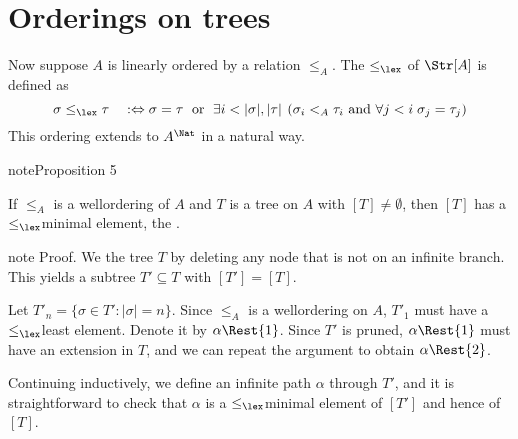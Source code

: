 \documentclass[letterpaper,10pt,english]{jupyterBook}
\begin{document}
\section{Orderings on trees}
\label{\detokenize{trees:orderings-on-trees}}
\sphinxAtStartPar
Now suppose \(A\) is linearly ordered by a relation \(\leq_A\).
The  \(\leq_{\lex}\) of \(\Str[A]\) is defined as
\begin{equation*}
	\sigma \leq_{\lex} \tau \quad :\Leftrightarrow \quad \\
        \sigma = \tau \; \text{ or } \; \exists i <|\sigma|,|\tau| \: \left( \sigma_i <_A \tau_i \text{ and } \forall j < i \; \sigma_j = \tau_j  \right )  
\end{equation*}
\sphinxAtStartPar
This ordering extends to \(A^\Nat\) in a natural way.
\label{trees:prop-leftmost-branch}
\begin{sphinxadmonition}{note}{Proposition 5}



\sphinxAtStartPar
If \(\leq_A\) is a well\sphinxhyphen{}ordering of \(A\) and \(T\) is a tree on \(A\) with \([T] \neq \emptyset\), then \([T]\) has a \(\leq_{\lex}\)\sphinxhyphen{}minimal element, the .
\end{sphinxadmonition}

\begin{sphinxadmonition}{note}
\sphinxAtStartPar
Proof. We  the tree \(T\) by deleting any node that is not on an infinite branch. This yields a subtree \(T' \subseteq T\) with \([T'] = [T]\).

\sphinxAtStartPar
Let \(T'_n = \{\sigma \in T' \colon |\sigma| = n \}\). Since \(\leq_A\) is a well\sphinxhyphen{}ordering on \(A\), \(T'_1\) must have a \(\leq_{\lex}\)\sphinxhyphen{}least element. Denote it by \(\alpha\Rest{1}\). Since \(T'\) is pruned, \(\alpha\Rest{1}\) must have an extension in \(T\), and we can repeat the argument to obtain \(\alpha\Rest{2}\).

\sphinxAtStartPar
Continuing inductively, we define an infinite path \(\alpha\) through \(T'\), and it is straightforward to check that \(\alpha\) is a  \(\leq_{\lex}\)\sphinxhyphen{}minimal element of \([T']\) and hence of \([T]\).
\end{sphinxadmonition}
\end{document}
